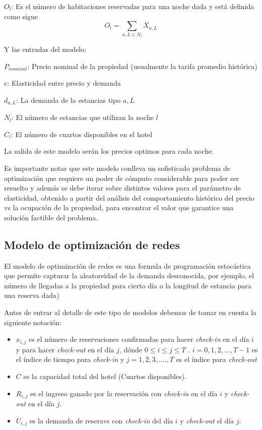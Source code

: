 {$O_l$: Es el número de habitaciones reservadas para una noche dada y está definida como sigue $$O_l = \sum_{a,L\in N_l} X_{a,L}$$

Y las entradas del modelo:

$P_{nominal}$: Precio nominal de la propiedad (usualmente la tarifa promedio histórica)

$e$: Elasticidad entre precio y demanda

$d_{a,L}$: La demanda de la estancias tipo $a,L$

$N_l$: El número de estancias que utilizan la noche $l$

$C_l$: El número de cuartos disponibles en el hotel

La salida de este modelo serán los precios optimos para cada noche. 

Es importante notar que este modelo conlleva un sofisticado problema de optimización que requiere un poder de cómputo considerable para poder ser resuelto y además se debe iterar sobre distintos valores para el parámetro de elasticidad, obtenido a partir del análisis del comportamiento histórico del precio vs la ocupación de la propiedad, para encontrar el valor que garantice una solución factible del problema.



 \subsection*{Modelo de optimización de redes}

El modelo de optimización de redes es una formula de programación estocástica que permite capturar la aleatoreidad de la demanda desconocida, por ejemplo, el número de llegadas a la propiedad para cierto día o la longitud de estancia para una reserva dada)

Antes de entrar al detalle de este tipo de modelos debemos de tomar en cuenta la siguiente notación:

\begin{itemize}
  \item $x_{i,j}$ es el número de reservaciones confirmadas para hacer \emph{check-in} en el día $i$ y para hacer \emph{check-out} en el día $j$, dónde $0\leq i \leq j \leq T$ . $i={0,1,2,...,T-1}$ es el índice de tiempo para \emph{check-in} y $j={1,2,3,....,T}$ es el índice para \emph{check-out}
  \item $C$ es la capacidad total del hotel (Cuartos disponibles).
  \item $R_{i,j}$ es el ingreso ganado por la reservación con \emph{check-in} en el día $i$ y \emph{check-out} en el día $j$.
  \item $U_{i,j}$ es la demanda de reseravs con \emph{check-in} del día $i$ y \emph{check-out} el día $j$.
\end{itemize}

}
